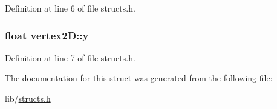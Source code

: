 Definition at line 6 of file structs.\+h.

\subsubsection[{\texorpdfstring{y}{y}}]{\setlength{\rightskip}{0pt plus 5cm}float vertex2\+D\+::y}\hypertarget{structvertex2_d_a6ca32b6427f8d3ce3437db0bafd92a00}{}\label{structvertex2_d_a6ca32b6427f8d3ce3437db0bafd92a00}


Definition at line 7 of file structs.\+h.



The documentation for this struct was generated from the following file\+:\begin{DoxyCompactItemize}
\item 
lib/\hyperlink{structs_8h}{structs.\+h}\end{DoxyCompactItemize}
